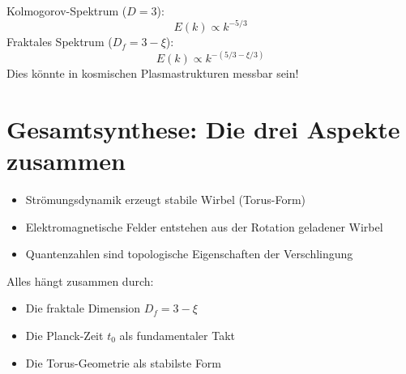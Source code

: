 	Kolmogorov-Spektrum (\( D = 3 \)):
	\[
	E(k) \propto k^{-5/3}
	\]
	Fraktales Spektrum (\( D_f = 3 - \xi \)):
	\[
	E(k) \propto k^{-(5/3 - \xi/3)}
	\]
	Dies könnte in kosmischen Plasmastrukturen messbar sein!
	
	\section{Gesamtsynthese: Die drei Aspekte zusammen}
	\begin{itemize}
		\item Strömungsdynamik erzeugt stabile Wirbel (Torus-Form)
		\item Elektromagnetische Felder entstehen aus der Rotation geladener Wirbel
		\item Quantenzahlen sind topologische Eigenschaften der Verschlingung
	\end{itemize}
	
	Alles hängt zusammen durch:
	\begin{itemize}
		\item Die fraktale Dimension \( D_f = 3 - \xi \)
		\item Die Planck-Zeit \( t_0 \) als fundamentaler Takt
		\item Die Torus-Geometrie als stabilste Form
	\end{itemize}
